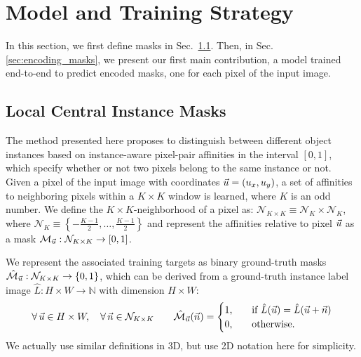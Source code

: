 
\section{Model and Training Strategy}\label{sec:model}
In this section, we first define \maskname masks in Sec.~\ref{sec:self_masks}.
Then, in Sec. \ref{sec:encoding_masks}, we present our first main contribution, a model trained end-to-end to predict encoded \maskname masks, one for each pixel of the input image. 

\subsection{Local Central Instance Masks}\label{sec:self_masks}
The method presented here proposes to distinguish between different object instances based on instance-aware pixel-pair affinities in the interval $[0,1]$, which specify whether or not two pixels belong to the same instance or not.
Given a pixel of the input image with coordinates $\vec{u}= (u_x, u_y)$, a set of affinities to neighboring pixels within a $K\times K$ window is learned, where $K$ is an odd number. 
We define the $K\times K$-neighborhood of a pixel as: 
$\mathcal{N}_{K\times K} \equiv \mathcal{N}_{K} \times \mathcal{N}_{K}$, where $\mathcal{N}_{K} \equiv \left\{-\frac{K-1}{2}, \ldots, \frac{K-1}{2}\right\}$ and represent the affinities relative to pixel $\vec{u}$ as a \maskname mask $\mathcal{M}_{\vec{u}}: \mathcal{N}_{K\times K} \rightarrow [0,1]$.

We represent the associated training targets as binary ground-truth masks $\hat{\mathcal{M}}_{\vec{u}}: \mathcal{N}_{K\times K} \rightarrow \{0,1\}$, which can be derived from a ground-truth instance label image $\hat{L}: H\times W \rightarrow \mathbb{N}$ with dimension $H\times W$:
\begin{equation}\label{eq:target_masks}
\forall\, \vec{u}\in H\times W, \quad \forall\, \vec{n}\in \mathcal{N}_{K\times K} \qquad \hat{\mathcal{M}}_{\vec{u}}(\vec{n}) = 
\begin{cases}
1, \quad &\text{if } \hat{L}(\vec{u}) = \hat{L}(\vec{u}+\vec{n}) \\
0, \quad & \text{otherwise}.
\end{cases}
\end{equation}
We actually use similar definitions in 3D, but use 2D notation here for simplicity.


